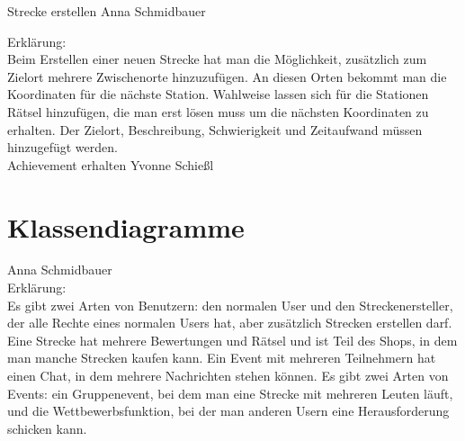 \documentclass[a4paper, 12pp]{article}
\begin{document}
{\Large Strecke erstellen}
Anna Schmidbauer
\begin{figure}[H] 
\centering
	\fbox{\begin{minipage}{16cm} 
	\end{minipage}}
\end{figure}

Erklärung:\\
Beim Erstellen einer neuen Strecke hat man die Möglichkeit, zusätzlich zum Zielort mehrere Zwischenorte hinzuzufügen. An diesen Orten bekommt man die Koordinaten für die nächste Station. Wahlweise lassen sich für die Stationen Rätsel hinzufügen, die man erst lösen muss um die nächsten Koordinaten zu erhalten. Der Zielort, Beschreibung, Schwierigkeit und Zeitaufwand müssen hinzugefügt werden.\\

{\Large Achievement erhalten}
Yvonne Schießl
\begin{figure}[H] 
\centering
	\fbox{\begin{minipage}{16cm} 
	\end{minipage}}
\end{figure}

\section{Klassendiagramme}


\begin{figure}[H] 
\centering
	\fbox{\begin{minipage}{16cm} 
	\end{minipage}}
\end{figure}
Anna Schmidbauer\\
Erklärung:\\
Es gibt zwei Arten von Benutzern: den normalen User und den Streckenersteller, der alle Rechte eines normalen Users hat, aber zusätzlich Strecken erstellen darf. Eine Strecke hat mehrere Bewertungen und Rätsel und ist Teil des Shops, in dem man manche Strecken kaufen kann. Ein Event mit mehreren Teilnehmern hat einen Chat, in dem mehrere Nachrichten stehen können. Es gibt zwei Arten von Events: ein Gruppenevent, bei dem man eine Strecke mit mehreren Leuten läuft, und die Wettbewerbsfunktion, bei der man anderen Usern eine Herausforderung schicken kann.\\
\end{document}
